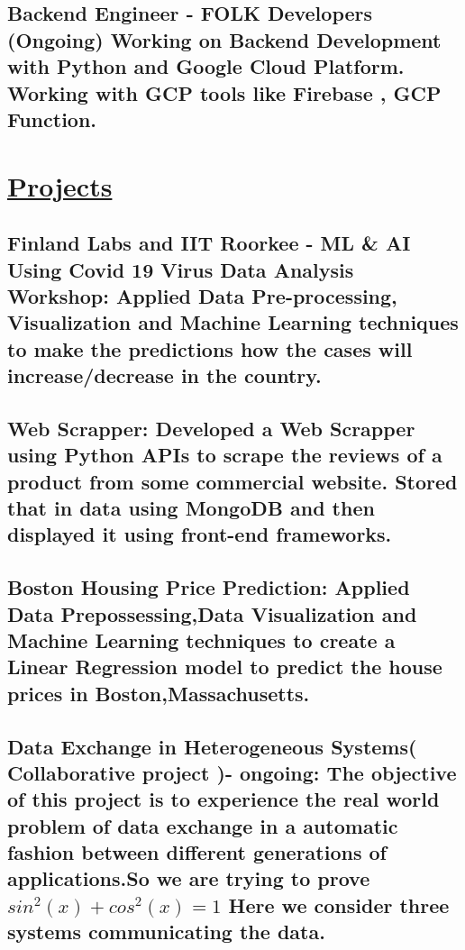 \documentclass{article}
\begin{document}
\subsection{\textbf{Backend Engineer}
    \textmd{- FOLK Developers (Ongoing)}\newline
    \textmd{Working on Backend Development with Python and Google Cloud Platform. Working with GCP tools like Firebase , GCP  Function. } }

\section{\underline{Projects}}

\subsection{\textbf{Finland Labs and IIT Roorkee - ML \& AI Using Covid 19 Virus Data Analysis Workshop:}
    \textmd{Applied Data Pre-processing, Visualization and Machine Learning techniques to make the predictions how the cases will increase/decrease in the country. } }

\subsection{\textbf{Web Scrapper:}
    \textmd{Developed a Web Scrapper using Python APIs to scrape the reviews of a product from some commercial website.
        Stored that in data using MongoDB and then displayed it using front-end frameworks.}}

\subsection{\textbf{Boston Housing Price Prediction:}
    \textmd{Applied Data Prepossessing,Data Visualization and Machine Learning techniques to create a
        Linear Regression model to predict the house prices in Boston,Massachusetts. } }

\subsection{\textbf{Data Exchange in Heterogeneous Systems( Collaborative project )- ongoing:}
    \textmd{The objective of this project is to experience the real
        world problem of data exchange in a automatic fashion between different generations
        of applications.So we are trying to prove $sin^2(x) + cos^2(x)=1$ }
    \textmd{Here we consider three systems communicating the data.}
}
\end{document}
